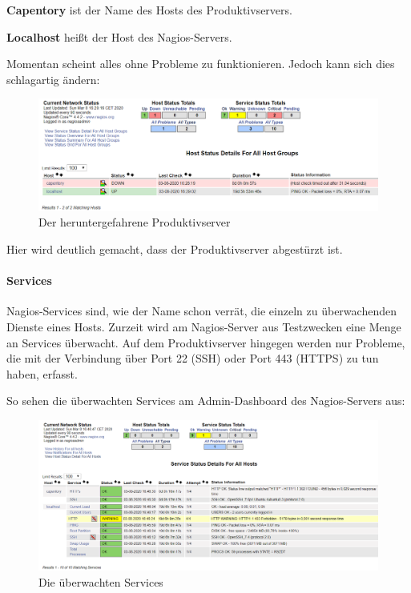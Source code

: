 \documentclass[
]{article}
\begin{document}
\textbf{Capentory} ist der Name des Hosts des Produktivservers.

\textbf{Localhost} heißt der Host des Nagios-Servers.

Momentan scheint alles ohne Probleme zu funktionieren. Jedoch kann sich
dies schlagartig ändern:

\begin{figure}[ht]
\centering
\includegraphics{dedprod.png}
\caption{Der heruntergefahrene Produktivserver}
\end{figure}

Hier wird deutlich gemacht, dass der Produktivserver abgestürzt ist.

\hypertarget{services}{%
\paragraph{Services}\label{services}}

Nagios-Services sind, wie der Name schon verrät, die einzeln zu
überwachenden Dienste eines Hosts. Zurzeit wird am Nagios-Server aus
Testzwecken eine Menge an Services überwacht. Auf dem Produktivserver
hingegen werden nur Probleme, die mit der Verbindung über Port 22 (SSH)
oder Port 443 (HTTPS) zu tun haben, erfasst.

So sehen die überwachten Services am Admin-Dashboard des Nagios-Servers
aus:

\begin{figure}[ht]
\centering
\includegraphics{services.png}
\caption{Die überwachten Services}
\end{figure}
\end{document}
